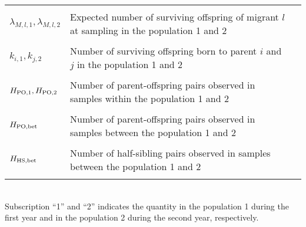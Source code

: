 \documentclass[12pt, English]{article}
\begin{document}
\begin{spacing}{1.9}
\begin{table}[tb]
\begin{tabular}{llc}
		                						& \\
	$\lambda_{M,l,1}, \lambda_{M,l,2}$		& Expected number of surviving offspring of migrant $l$ at sampling in the population 1 and 2\\
		                						& \\
	$k_{i,1}, k_{j,2}$					& Number of surviving offspring born to parent $i$ and $j$ in the population 1 and 2\\ 
	                							& \\
	$H_{\rm PO, 1}, H_{\rm PO, 2}$		& Number of parent-offspring pairs observed in samples within the population 1 and 2\\ 
	                							& \\
	$H_{\rm PO, bet}$					& Number of parent-offspring pairs observed in samples between the population 1 and 2\\ 
	                							& \\
	$H_{\rm HS, bet}$					& Number of half-sibling pairs observed in samples between the population 1 and 2\\ 
	                							& \\              		
	\hline
    \end{tabular}
    \label{symbols} 
\\Subscription ``1'' and ``2'' indicates the quantity in the population 1 during the first year and in the population 2 during the second year, respectively. 
\end{table}
\renewcommand{\arraystretch}{1}

\clearpage


\end{spacing}
\end{document}
